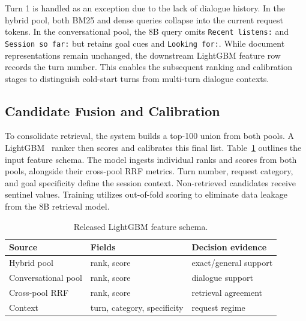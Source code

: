 Turn 1 is handled as an exception due to the lack of dialogue history. In the hybrid pool, both BM25 and dense queries collapse into the current request tokens. In the conversational pool, the 8B query omits \texttt{Recent listens:} and \texttt{Session so far:} but retains goal cues and \texttt{Looking for:}. While document representations remain unchanged, the downstream LightGBM feature row records the turn number. This enables the subsequent ranking and calibration stages to distinguish cold-start turns from multi-turn dialogue contexts.


\subsection{Candidate Fusion and Calibration}

To consolidate retrieval, the system builds a top-100 union from both pools. A LightGBM~\cite{ke2017lightgbm} ranker then scores and calibrates this final list. Table~\ref{tab:features} outlines the input feature schema. The model ingests individual ranks and scores from both pools, alongside their cross-pool RRF metrics. Turn number, request category, and goal specificity define the session context. Non-retrieved candidates receive sentinel values. Training utilizes out-of-fold scoring to eliminate data leakage from the 8B retrieval model.

\begin{table}[h]
  \caption{Released LightGBM feature schema.}
  \label{tab:features}
  \centering
  \scriptsize
  \setlength{\tabcolsep}{3pt}
  \begin{tabular}{@{}lll@{}}
    \toprule
    Source & Fields & Decision evidence \\
    \midrule
    Hybrid pool & rank, score & exact/general support \\
    Conversational pool & rank, score & dialogue support \\
    Cross-pool RRF & rank, score & retrieval agreement \\
    Context & turn, category, specificity & request regime \\
    \bottomrule
  \end{tabular}
\end{table}

